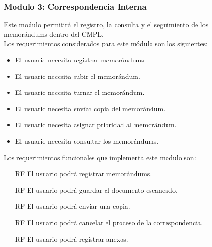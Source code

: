 \subsubsection{Modulo 3: Correspondencia Interna}
Este modulo permitirá el registro, la consulta y el seguimiento de los memorándums dentro del CMPL.\\

Los requerimientos considerados para este módulo son los siguientes: 
\begin{itemize}
	\item El usuario necesita registrar memorándums.
	\item El usuario necesita subir el memorándum.
	\item El usuario necesita turnar el memorándum.
	\item El usuario necesita envíar copia del memorándum.
	\item El usuario necesita asignar prioridad al memorándum.
	\item El usuario necesita consultar los memorándums. 
\end{itemize}

Los requerimientos funcionales que implementa este modulo son: 

\begin{itemize}
	\item[RF] El usuario podrá registrar memorándums.
	\item[RF] El usuario podrá guardar el documento escaneado.
	\item[RF] El usuario podrá enviar una copia.
	\item[RF] El usuario podrá cancelar el proceso de la correspondencia.
	\item[RF] El usuario podrá registrar anexos.
\end{itemize}



